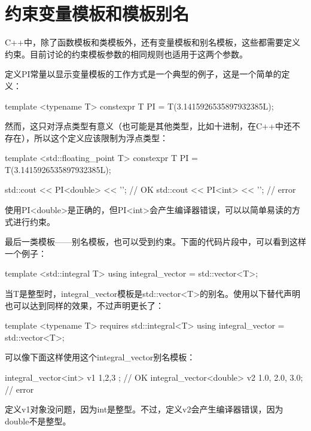 \section{约束变量模板和模板别名}
C++中，除了函数模板和类模板外，还有变量模板和别名模板，这些都需要定义约束。目前讨论的约束模板参数的相同规则也适用于这两个参数。

定义PI常量以显示变量模板的工作方式是一个典型的例子，这是一个简单的定义：

\begin{cpp}
template <typename T>
constexpr T PI = T(3.1415926535897932385L);
\end{cpp}

然而，这只对浮点类型有意义（也可能是其他类型，比如十进制，在C++中还不存在），所以这个定义应该限制为浮点类型：

\begin{cpp}
template <std::floating_point T>
constexpr T PI = T(3.1415926535897932385L);

std::cout << PI<double> << '\n'; // OK
std::cout << PI<int> << '\n'; // error
\end{cpp}

使用PI<double>是正确的，但PI<int>会产生编译器错误，可以以简单易读的方式进行约束。

最后一类模板——别名模板，也可以受到约束。下面的代码片段中，可以看到这样一个例子：

\begin{cpp}
template <std::integral T>
using integral_vector = std::vector<T>;
\end{cpp}

当T是整型时，integral\_vector模板是std::vector<T>的别名。使用以下替代声明也可以达到同样的效果，不过声明更长了：

\begin{cpp}
template <typename T>
requires std::integral<T>
using integral_vector = std::vector<T>;
\end{cpp}

可以像下面这样使用这个integral\_vector别名模板：

\begin{cpp}
integral_vector<int> v1 { 1,2,3 }; // OK
integral_vector<double> v2 {1.0, 2.0, 3.0}; // error
\end{cpp}

定义v1对象没问题，因为int是整型。不过，定义v2会产生编译器错误，因为double不是整型。

